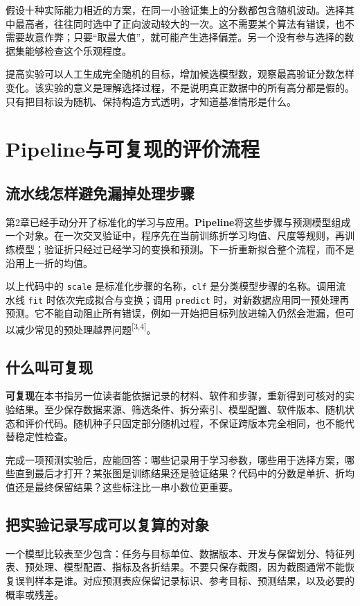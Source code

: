 假设十种实际能力相近的方案，在同一小验证集上的分数都包含随机波动。选择其中最高者，往往同时选中了正向波动较大的一次。这不需要某个算法有错误，也不需要故意作弊；只要“取最大值”，就可能产生选择偏差。另一个没有参与选择的数据集能够检查这个乐观程度。

提高实验可以人工生成完全随机的目标，增加候选模型数，观察最高验证分数怎样变化。该实验的意义是理解选择过程，不是说明真正数据中的所有高分都是假的。只有把目标设为随机、保持构造方式透明，才知道基准情形是什么。

\section{Pipeline与可复现的评价流程}
\subsection{流水线怎样避免漏掉处理步骤}
第2章已经手动分开了标准化的学习与应用。\textbf{Pipeline}将这些步骤与预测模型组成一个对象。在一次交叉验证中，程序先在当前训练折学习均值、尺度等规则，再训练模型；验证折只经过已经学习的变换和预测。下一折重新拟合整个流程，而不是沿用上一折的均值。

以上代码中的 \texttt{scale} 是标准化步骤的名称，\texttt{clf} 是分类模型步骤的名称。调用流水线 \texttt{fit} 时依次完成拟合与变换；调用 \texttt{predict} 时，对新数据应用同一预处理再预测。它不能自动阻止所有错误，例如一开始把目标列放进输入仍然会泄漏，但可以减少常见的预处理越界问题\textsuperscript{[3,4]}。

\subsection{什么叫可复现}
\textbf{可复现}在本书指另一位读者能依据记录的材料、软件和步骤，重新得到可核对的实验结果。至少保存数据来源、筛选条件、拆分索引、模型配置、软件版本、随机状态和评价代码。随机种子只固定部分随机过程，不保证跨版本完全相同，也不能代替稳定性检查。

完成一项预测实验后，应能回答：哪些记录用于学习参数，哪些用于选择方案，哪些直到最后才打开？某张图是训练结果还是验证结果？代码中的分数是单折、折均值还是最终保留结果？这些标注比一串小数位更重要。

\subsection{把实验记录写成可以复算的对象}
一个模型比较表至少包含：任务与目标单位、数据版本、开发与保留划分、特征列表、预处理、模型配置、指标及各折结果。不要只保存截图，因为截图通常不能恢复误判样本是谁。对应预测表应保留记录标识、参考目标、预测结果，以及必要的概率或残差。

